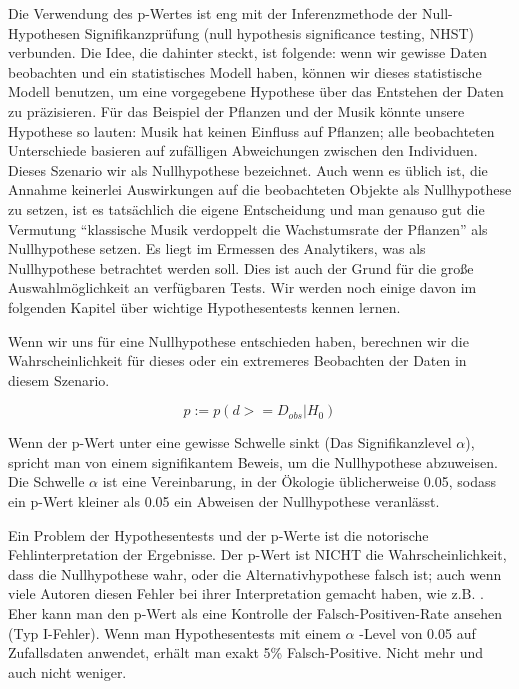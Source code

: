 \documentclass[a4paper,twoside]{tufte-book}\usepackage[]{graphicx}\usepackage[]{color}
\begin{document}
Die Verwendung des p-Wertes ist eng mit der Inferenzmethode der Null-Hypothesen Signifikanzprüfung (null hypothesis significance testing, NHST) verbunden. Die Idee, die dahinter steckt, ist folgende: wenn wir gewisse Daten beobachten und ein statistisches Modell haben, können wir dieses statistische Modell benutzen, um eine vorgegebene Hypothese über das Entstehen der Daten zu präzisieren. Für das Beispiel der Pflanzen und der Musik könnte unsere Hypothese so lauten: Musik hat keinen Einfluss auf Pflanzen; alle beobachteten Unterschiede basieren auf zufälligen Abweichungen zwischen den Individuen. Dieses Szenario wir als Nullhypothese bezeichnet.  Auch wenn es üblich ist, die Annahme keinerlei Auswirkungen auf die beobachteten Objekte als Nullhypothese zu setzen, ist es tatsächlich die eigene Entscheidung und man genauso gut die Vermutung "`klassische Musik verdoppelt die Wachstumsrate der Pflanzen"' als Nullhypothese setzen. Es liegt im Ermessen des Analytikers, was als Nullhypothese betrachtet werden soll. Dies ist auch der Grund für die große Auswahlmöglichkeit an verfügbaren Tests. Wir werden noch einige davon im folgenden Kapitel über wichtige Hypothesentests kennen lernen.

Wenn wir uns für eine Nullhypothese entschieden haben, berechnen wir die Wahrscheinlichkeit für dieses oder ein extremeres Beobachten der Daten in diesem Szenario.  

\begin{equation}
p := p(d >= D_{obs} | H_0)
\end{equation}

Wenn der p-Wert unter eine gewisse Schwelle sinkt (Das Signifikanzlevel $\alpha$), spricht man von einem signifikantem Beweis, um die Nullhypothese abzuweisen. Die Schwelle $\alpha$ ist eine Vereinbarung, in der Ökologie üblicherweise 0.05, sodass ein p-Wert kleiner als 0.05 ein Abweisen der Nullhypothese veranlässt.  

Ein Problem der Hypothesentests und der p-Werte ist die notorische Fehlinterpretation der Ergebnisse. Der p-Wert ist NICHT die Wahrscheinlichkeit, dass die Nullhypothese wahr, oder die Alternativhypothese falsch ist; auch wenn viele Autoren diesen Fehler bei ihrer Interpretation gemacht haben, wie z.B. \citep[][]{Cohen-earthisround-1994}. Eher kann man den p-Wert als eine Kontrolle der Falsch-Positiven-Rate ansehen (Typ I-Fehler). Wenn man Hypothesentests mit einem $\alpha$ -Level von 0.05 auf Zufallsdaten anwendet, erhält man exakt 5\% Falsch-Positive. Nicht mehr und auch nicht weniger.  
\end{document}
